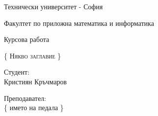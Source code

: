 \documentclass[a4paper,fleqn,12pt]{article}
\begin{document}
\begin{titlepage}
	\setlength{\parindent}{0pt}
	\large
\centering
Технически университет -  София \par
Факултет по приложна математика и информатика \par
\vspace{2cm}

{\huge Курсова работа \par}

\vspace{2cm}

\vspace{1cm}
{\LARGE\scshape  \{ Някво заглавие \} \par}



\vfill

\begin{minipage}[t]{.5\linewidth}
	Студент: \\
	Кристиян Кръчмаров
\end{minipage}%
\begin{minipage}[t]{.5\linewidth}
	\raggedleft
	Преподавател:\\
	\{ името на педала \}
\end{minipage}

\vspace{2cm}
\raggedright

\end{titlepage}
\end{document}
